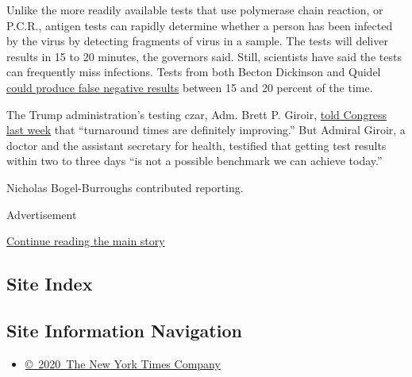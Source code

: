 Unlike the more readily available tests that use polymerase chain
reaction, or P.C.R., antigen tests can rapidly determine whether a
person has been infected by the virus by detecting fragments of virus in
a sample. The tests will deliver results in 15 to 20 minutes, the
governors said. Still, scientists have said the tests can frequently
miss infections. Tests from both Becton Dickinson and Quidel
\href{https://www.nytimes.com/2020/07/06/health/fast-coronavirus-tests.html}{could
produce false negative results} between 15 and 20 percent of the time.

The Trump administration's testing czar, Adm. Brett P. Giroir,
\href{https://www.nytimes.com/2020/07/31/us/politics/trump-coronavirus-testing.html}{told
Congress last week} that ``turnaround times are definitely improving.''
But Admiral Giroir, a doctor and the assistant secretary for health,
testified that getting test results within two to three days ``is not a
possible benchmark we can achieve today.''

Nicholas Bogel-Burroughs contributed reporting.

Advertisement

\protect\hyperlink{after-bottom}{Continue reading the main story}

\hypertarget{site-index}{%
\subsection{Site Index}\label{site-index}}

\hypertarget{site-information-navigation}{%
\subsection{Site Information
Navigation}\label{site-information-navigation}}

\begin{itemize}
\tightlist
\item
  \href{https://help.nytimes.com/hc/en-us/articles/115014792127-Copyright-notice}{©~2020~The
  New York Times Company}
\end{itemize}

